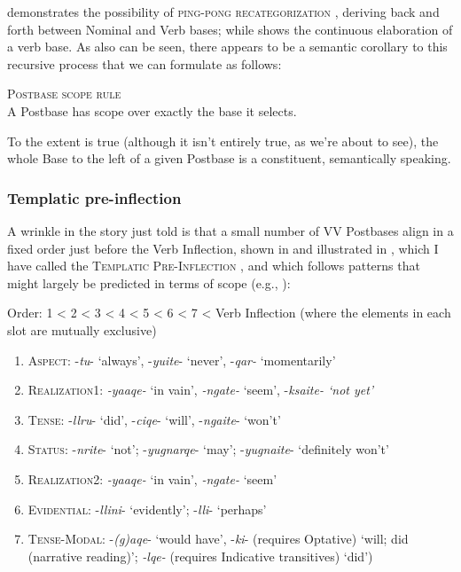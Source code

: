 \documentclass[output=paper]{langscibook}
\begin{document}
  demonstrates the possibility of \textsc{ping-pong} \textsc{recategorization} \citep[86]{Mattissen2017}, deriving back and forth between Nominal and Verb bases; while  shows the continuous elaboration of a verb base.
As also can be seen, there appears to be a semantic corollary to this recursive process that we can formulate as follows:

\ea\label{ex:key:11}
{\textsc{Postbase} \textsc{scope} \textsc{rule}}\\
A Postbase has scope over exactly the base it selects.
\z

To the extent  is true (although it isn't entirely true, as we're about to see), the whole Base to the left of a given Postbase is a constituent, semantically speaking.

\subsubsection{Templatic pre-inflection} \label{sec:3.2.2}

A wrinkle in the story just told is that a small number of VV Postbases align in a fixed order just before the Verb Inflection, shown in  and illustrated in , which I have called the \textsc{Templatic} \textsc{Pre-Inflection} \citep{Woodbury1981}, and which follows patterns that might largely be predicted in terms of scope (e.g., \citealt[208--224]{Foley1984}):

\ea\label{ex:key:12}
{Order: 1 < 2 < 3 < 4 < 5 < 6 < 7 < Verb Inflection (where the elements in each slot are mutually exclusive)}\\
\begin{enumerate}
    \item \textsc{Aspect:} {}-\textit{tu}{}- `always', -\textit{yuite}{}- `never', -\textit{qar-} `momentarily'
    \item \textsc{Realization1:} \textit{{}-yaaqe-} `in vain', \textit{{}-ngate-} `seem', -\textit{ksaite- `not yet'}
    \item \textsc{Tense:} {}-\textit{llru}{}- `did', -\textit{ciqe}{}- `will', -\textit{ngaite}{}- `won't'
    \item \textsc{Status:} {}-\textit{nrite}{}- `not'; -\textit{yugnarqe}{}- `may'; -\textit{yugnaite}{}- `definitely won't'
    \item \textsc{Realization2:} \textit{{}-yaaqe-} `in vain', \textit{{}-ngate-} `seem'
    \item \textsc{Evidential}: -\textit{llini}{}- `evidently'; -\textit{lli}{}- `perhaps'
    \item \textsc{Tense-Modal:} {}-\textit{(g)aqe}{}- `would have', -\textit{ki}{}- (requires Optative) `will; did (narrative reading)'; \textit{{}-lqe-} (requires Indicative transitives) `did')
\end{enumerate}
\z
\end{document}
